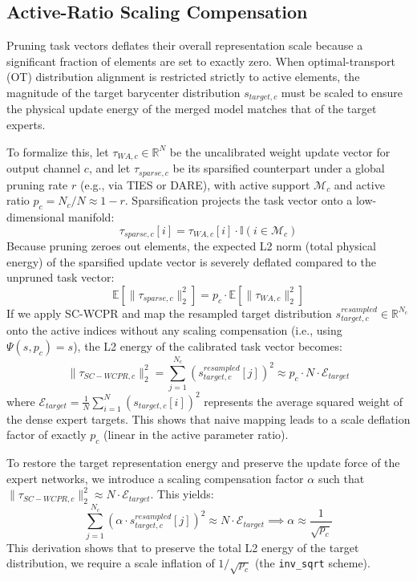 \documentclass{article}
\theoremstyle{plain}
\theoremstyle{definition}
\theoremstyle{remark}
\begin{document}
\subsection{Active-Ratio Scaling Compensation}
\label{subsec:compensation}

Pruning task vectors deflates their overall representation scale because a significant fraction of elements are set to exactly zero. When optimal-transport (OT) distribution alignment is restricted strictly to active elements, the magnitude of the target barycenter distribution $s_{target, c}$ must be scaled to ensure the physical update energy of the merged model matches that of the target experts.

To formalize this, let $\tau_{WA, c} \in \mathbb{R}^N$ be the uncalibrated weight update vector for output channel $c$, and let $\tau_{sparse, c}$ be its sparsified counterpart under a global pruning rate $r$ (e.g., via TIES or DARE), with active support $\mathcal{M}_c$ and active ratio $p_c = N_c / N \approx 1-r$. 
Sparsification projects the task vector onto a low-dimensional manifold:
\begin{equation}
    \tau_{sparse, c}[i] = \tau_{WA, c}[i] \cdot \mathbb{I}(i \in \mathcal{M}_c)
\end{equation}
Because pruning zeroes out elements, the expected L2 norm (total physical energy) of the sparsified update vector is severely deflated compared to the unpruned task vector:
\begin{equation}
    \mathbb{E}[\|\tau_{sparse, c}\|_2^2] = p_c \cdot \mathbb{E}[\|\tau_{WA, c}\|_2^2]
\end{equation}
If we apply SC-WCPR and map the resampled target distribution $s_{target, c}^{resampled} \in \mathbb{R}^{N_c}$ onto the active indices without any scaling compensation (i.e., using $\Psi(s, p_c) = s$), the L2 energy of the calibrated task vector becomes:
\begin{equation}
    \|\tau_{SC-WCPR, c}\|_2^2 = \sum_{j=1}^{N_c} (s_{target, c}^{resampled}[j])^2 \approx p_c \cdot N \cdot \mathcal{E}_{target}
\end{equation}
where $\mathcal{E}_{target} = \frac{1}{N}\sum_{i=1}^N (s_{target, c}[i])^2$ represents the average squared weight of the dense expert targets. This shows that naive mapping leads to a scale deflation factor of exactly $p_c$ (linear in the active parameter ratio).

To restore the target representation energy and preserve the update force of the expert networks, we introduce a scaling compensation factor $\alpha$ such that $\|\tau_{SC-WCPR, c}\|_2^2 \approx N \cdot \mathcal{E}_{target}$. This yields:
\begin{equation}
    \sum_{j=1}^{N_c} (\alpha \cdot s_{target, c}^{resampled}[j])^2 \approx N \cdot \mathcal{E}_{target} \implies \alpha \approx \frac{1}{\sqrt{p_c}}
\end{equation}
This derivation shows that to preserve the total L2 energy of the target distribution, we require a scale inflation of $1 / \sqrt{p_c}$ (the \texttt{inv\_sqrt} scheme). 
\end{document}
